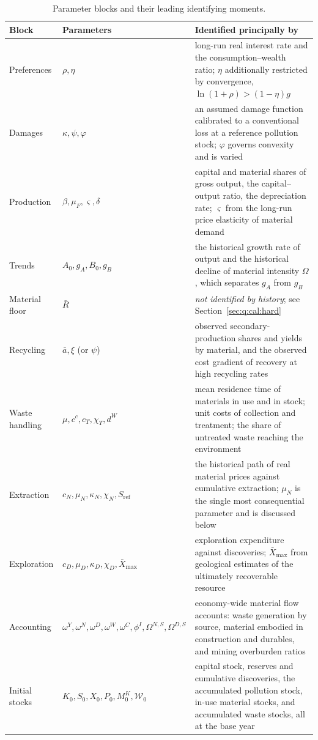 \begin{table}[H]
\centering
\caption{Parameter blocks and their leading identifying moments.}\label{tab:q:cal}
\begin{tabular}{L{3.1cm}L{4.2cm}L{6.4cm}}
\toprule
Block & Parameters & Identified principally by \\
\midrule
Preferences &
$\rho,\eta$ &
long-run real interest rate and the consumption--wealth ratio; $\eta$ additionally restricted by convergence, $\ln\left(1+\rho\right)>\left(1-\eta\right)g$ \\
Damages &
$\kappa,\psi,\varphi$ &
an assumed damage function calibrated to a conventional loss at a reference pollution stock; $\varphi$ governs convexity and is varied \\
Production &
$\beta,\mu_F,\varsigma,\delta$ &
capital and material shares of gross output, the capital--output ratio, the depreciation rate; $\varsigma$ from the long-run price elasticity of material demand \\
Trends &
$A_0,g_A,B_0,g_B$ &
the historical growth rate of output and the historical decline of material intensity $\Omega$, which separates $g_A$ from $g_B$ \\
Material floor &
$\bar R$ &
\emph{not identified by history}; see Section~\ref{sec:q:cal:hard} \\
Recycling &
$\bar a,\xi$ (or $\psi$) &
observed secondary-production shares and yields by material, and the observed cost gradient of recovery at high recycling rates \\
Waste handling &
$\mu,c^c,c_T,\chi_T,d^W$ &
mean residence time of materials in use and in stock; unit costs of collection and treatment; the share of untreated waste reaching the environment \\
Extraction &
$c_N,\mu_N,\kappa_N,\chi_N,S_{\mathrm{ref}}$ &
the historical path of real material prices against cumulative extraction; $\mu_N$ is the single most consequential parameter and is discussed below \\
Exploration &
$c_D,\mu_D,\kappa_D,\chi_D,\bar X_{\max}$ &
exploration expenditure against discoveries; $\bar X_{\max}$ from geological estimates of the ultimately recoverable resource \\
Accounting &
$\omega^Y,\omega^N,\omega^D,\omega^W,\omega^C,\phi^I,\Omega^{N,S},\Omega^{D,S}$ &
economy-wide material flow accounts: waste generation by source, material embodied in construction and durables, and mining overburden ratios \\
Initial stocks &
$K_0,S_0,X_0,P_0,M^K_0,\mathcal W_0$ &
capital stock, reserves and cumulative discoveries, the accumulated pollution stock, in-use material stocks, and accumulated waste stocks, all at the base year \\
\bottomrule
\end{tabular}
\end{table}

